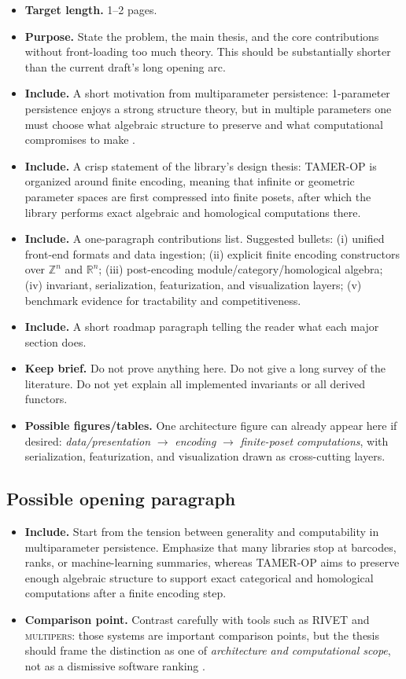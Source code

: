 \documentclass[11pt]{article}
\newcommand{\R}{\mathbb{R}}
\newcommand{\Z}{\mathbb{Z}}
\newcommand{\TAMER}{\textsc{TAMER-OP}}
\newcommand{\multipers}{\textsc{multipers}}
\newenvironment{plan}{\begin{itemize}[leftmargin=1.6em,itemsep=0.35em,topsep=0.25em]}{\end{itemize}}
\newcommand{\target}[1]{\item \textbf{Target length.} #1}
\newcommand{\purpose}[1]{\item \textbf{Purpose.} #1}
\newcommand{\includeitems}[1]{\item \textbf{Include.} #1}
\newcommand{\keepbrief}[1]{\item \textbf{Keep brief.} #1}
\newcommand{\figures}[1]{\item \textbf{Possible figures/tables.} #1}
\newcommand{\compare}[1]{\item \textbf{Comparison point.} #1}
\begin{document}
\begin{plan}
    \target{1--2 pages.}
    \purpose{State the problem, the main thesis, and the core contributions without front-loading too much theory. This should be substantially shorter than the current draft's long opening arc.}
    \includeitems{A short motivation from multiparameter persistence: 1-parameter persistence enjoys a strong structure theory, but in multiple parameters one must choose what algebraic structure to preserve and what computational compromises to make \cite{CZ09,Les15,CDSGO16}.}
    \includeitems{A crisp statement of the library's design thesis: \TAMER{} is organized around finite encoding, meaning that infinite or geometric parameter spaces are first compressed into finite posets, after which the library performs exact algebraic and homological computations there.}
    \includeitems{A one-paragraph contributions list. Suggested bullets: (i) unified front-end formats and data ingestion; (ii) explicit finite encoding constructors over $\Z^n$ and $\R^n$; (iii) post-encoding module/category/homological algebra; (iv) invariant, serialization, featurization, and visualization layers; (v) benchmark evidence for tractability and competitiveness.}
    \includeitems{A short roadmap paragraph telling the reader what each major section does.}
    \keepbrief{Do not prove anything here. Do not give a long survey of the literature. Do not yet explain all implemented invariants or all derived functors.}
    \figures{One architecture figure can already appear here if desired: \emph{data/presentation} $\to$ \emph{encoding} $\to$ \emph{finite-poset computations}, with serialization, featurization, and visualization drawn as cross-cutting layers.}
\end{plan}

\subsection{Possible opening paragraph}

\begin{plan}
    \includeitems{Start from the tension between generality and computability in multiparameter persistence. Emphasize that many libraries stop at barcodes, ranks, or machine-learning summaries, whereas \TAMER{} aims to preserve enough algebraic structure to support exact categorical and homological computations after a finite encoding step.}
    \compare{Contrast carefully with tools such as RIVET and \multipers: those systems are important comparison points, but the thesis should frame the distinction as one of \emph{architecture and computational scope}, not as a dismissive software ranking \cite{LW15,RIVET,LS24}.}
\end{plan}
\end{document}
